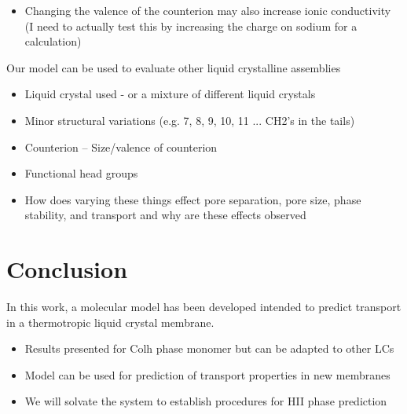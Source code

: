 \documentclass{article}
\begin{document}
\begin{itemize}
\begin{itemize}
			\item Changing the valence of the counterion may also increase ionic conductivity (I need to actually test this by increasing the charge on sodium for a calculation)
                \end{itemize}                    
	\end{itemize}

	Our model can be used to evaluate other liquid crystalline assemblies
		\begin{itemize}
			\item Liquid crystal used - or a mixture of different liquid crystals
			\item Minor structural variations (e.g. 7, 8, 9, 10, 11 ... CH2's in the tails)
			\item Counterion -- Size/valence of counterion
			\item Functional head groups
			\item How does varying these things effect pore separation, pore size, phase stability, and transport and why are these effects observed
		\end{itemize} 
		
	\section{Conclusion}

	In this work, a molecular model has been developed intended to predict transport in a thermotropic liquid crystal membrane. 
	\begin{itemize}
		\item Results presented for Colh phase monomer but can be adapted to other LCs
		\item Model can be used for prediction of transport properties in new membranes
		\item We will solvate the system to establish procedures for HII phase prediction
	\end{itemize}
	
	
\end{document}
